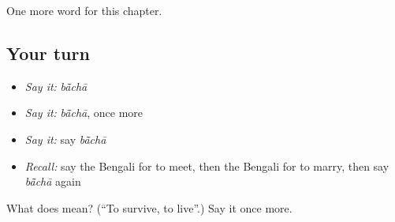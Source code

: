 \begin{grammarlens}[title={What you've built}]
One more word for this chapter.
\end{grammarlens}

\subsection*{Your turn}
\begin{itemize}
\raggedright
  \item \emph{Say it:} \emph{bā̃chā}
  \item \emph{Say it:} \emph{bā̃chā}, once more
  \item \emph{Say it:} say \emph{bā̃chā}
  \item \emph{Recall:} say the Bengali for to meet, then the Bengali for to marry, then say \emph{bā̃chā} again
\end{itemize}

\begin{tcolorbox}[breakable,colback=teal!4,colframe=teal!35!black,title={Before you move on}]
What does  mean? (\textquotedblleft{}To survive, to live\textquotedblright{}.) Say it once more.
\end{tcolorbox}
